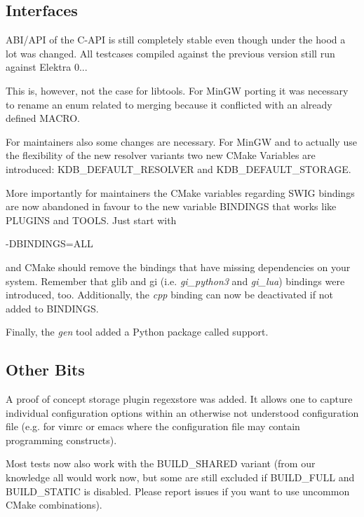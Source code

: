 \subsection*{Interfaces}

A\+B\+I/\+A\+PI of the C-\/\+A\+PI is still completely stable even though under the hood a lot was changed. All testcases compiled against the previous version still run against Elektra 0...

This is, however, not the case for libtools. For Min\+GW porting it was necessary to rename an enum related to merging because it conflicted with an already defined M\+A\+C\+RO.

For maintainers also some changes are necessary. For Min\+GW and to actually use the flexibility of the new resolver variants two new C\+Make Variables are introduced\+: K\+D\+B\+\_\+\+D\+E\+F\+A\+U\+L\+T\+\_\+\+R\+E\+S\+O\+L\+V\+ER and K\+D\+B\+\_\+\+D\+E\+F\+A\+U\+L\+T\+\_\+\+S\+T\+O\+R\+A\+GE.

More importantly for maintainers the C\+Make variables regarding S\+W\+IG bindings are now abandoned in favour to the new variable B\+I\+N\+D\+I\+N\+GS that works like P\+L\+U\+G\+I\+NS and T\+O\+O\+LS. Just start with \begin{DoxyVerb}    -DBINDINGS=ALL
\end{DoxyVerb}


and C\+Make should remove the bindings that have missing dependencies on your system. Remember that glib and gi (i.\+e. {\itshape gi\+\_\+python3} and {\itshape gi\+\_\+lua}) bindings were introduced, too. Additionally, the {\itshape cpp} binding can now be deactivated if not added to B\+I\+N\+D\+I\+N\+GS.

Finally, the {\itshape gen} tool added a Python package called {\ttfamily support}.

\subsection*{Other Bits}

A proof of concept storage plugin {\ttfamily regexstore} was added. It allows one to capture individual configuration options within an otherwise not understood configuration file (e.\+g. for vimrc or emacs where the configuration file may contain programming constructs).

Most tests now also work with the B\+U\+I\+L\+D\+\_\+\+S\+H\+A\+R\+ED variant (from our knowledge all would work now, but some are still excluded if B\+U\+I\+L\+D\+\_\+\+F\+U\+LL and B\+U\+I\+L\+D\+\_\+\+S\+T\+A\+T\+IC is disabled. Please report issues if you want to use uncommon C\+Make combinations).

